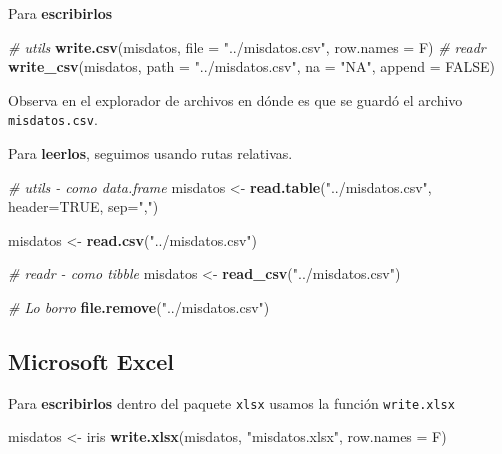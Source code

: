 \documentclass[]{article}
\newenvironment{Shaded}{\begin{snugshade}}{\end{snugshade}}
\newcommand{\KeywordTok}[1]{\textcolor[rgb]{0.13,0.29,0.53}{\textbf{#1}}}
\newcommand{\DataTypeTok}[1]{\textcolor[rgb]{0.13,0.29,0.53}{#1}}
\newcommand{\StringTok}[1]{\textcolor[rgb]{0.31,0.60,0.02}{#1}}
\newcommand{\CommentTok}[1]{\textcolor[rgb]{0.56,0.35,0.01}{\textit{#1}}}
\newcommand{\OtherTok}[1]{\textcolor[rgb]{0.56,0.35,0.01}{#1}}
\newcommand{\NormalTok}[1]{#1}
\begin{document}
Para \textbf{escribirlos}

\begin{Shaded}
\begin{Highlighting}[]
\CommentTok{# utils }
\KeywordTok{write.csv}\NormalTok{(misdatos, }\DataTypeTok{file =} \StringTok{"../misdatos.csv"}\NormalTok{, }\DataTypeTok{row.names =}\NormalTok{ F)}
\CommentTok{# readr}
\KeywordTok{write_csv}\NormalTok{(misdatos, }\DataTypeTok{path =} \StringTok{"../misdatos.csv"}\NormalTok{, }\DataTypeTok{na =} \StringTok{"NA"}\NormalTok{, }\DataTypeTok{append =} \OtherTok{FALSE}\NormalTok{)}
\end{Highlighting}
\end{Shaded}

Observa en el explorador de archivos en dónde es que se guardó el
archivo \texttt{misdatos.csv}.

Para \textbf{leerlos}, seguimos usando rutas relativas.

\begin{Shaded}
\begin{Highlighting}[]
\CommentTok{# utils - como data.frame}
\NormalTok{misdatos <-}\StringTok{ }\KeywordTok{read.table}\NormalTok{(}\StringTok{"../misdatos.csv"}\NormalTok{, }\DataTypeTok{header=}\OtherTok{TRUE}\NormalTok{,}
   \DataTypeTok{sep=}\StringTok{","}\NormalTok{)}

\NormalTok{misdatos <-}\StringTok{ }\KeywordTok{read.csv}\NormalTok{(}\StringTok{"../misdatos.csv"}\NormalTok{)}

\CommentTok{# readr - como tibble}
\NormalTok{misdatos <-}\StringTok{ }\KeywordTok{read_csv}\NormalTok{(}\StringTok{"../misdatos.csv"}\NormalTok{)}

\CommentTok{# Lo borro}
\KeywordTok{file.remove}\NormalTok{(}\StringTok{"../misdatos.csv"}\NormalTok{)}
\end{Highlighting}
\end{Shaded}

\subsection{Microsoft Excel}\label{microsoft-excel}

Para \textbf{escribirlos} dentro del paquete \texttt{xlsx} usamos la
función \texttt{write.xlsx}

\begin{Shaded}
\begin{Highlighting}[]
\NormalTok{misdatos <-}\StringTok{ }\NormalTok{iris}
\KeywordTok{write.xlsx}\NormalTok{(misdatos, }\StringTok{"misdatos.xlsx"}\NormalTok{, }\DataTypeTok{row.names =}\NormalTok{ F)}
\end{Highlighting}
\end{Shaded}
\end{document}
